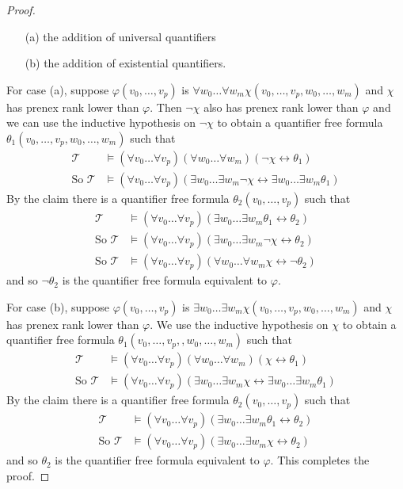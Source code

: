 \documentclass[titlepage, oneside]{amsbook}
\theoremstyle{plain}
\theoremstyle{definition}
\theoremstyle{remark}
\newcommand{\theory}{\ensuremath{\mathcal{T}}}
\newcommand{\frv}[2][0]{\ensuremath{\forall v_{#1} \dots  \forall   
v_{#2}}}
\newcommand{\frw}[2][0]{\ensuremath{\forall w_{#1}  \dots  \forall   
w_{#2}}}
\newcommand{\exw}[2][0]{\ensuremath{\exists w_{#1}  \dots  \exists
w_{#2}}}
\newcommand{\vnot}[2][0]{\ensuremath{ v_{#1} , \dots , v_{#2}}}
\newcommand{\wnot}[2][0]{\ensuremath{ w_{#1} , \dots , w_{#2}}}
\begin{document}
\begin{proof}
\begin{itemize}
\item[(a)] the addition of universal quantifiers
\item[(b)] the addition of existential quantifiers.
\end{itemize}

For case (a), suppose $\varphi ( \vnot p ) $ is $\frw m \chi ( \vnot p
, \wnot m )$ and $\chi$ has prenex rank lower than $\varphi$. Then
$\neg \chi$ also has prenex rank lower than $\varphi$ and we can use
the inductive hypothesis on $\neg \chi$ to obtain a quantifier free
formula $\theta_1 ( \vnot p , \wnot m )$ such that 
\[\begin{aligned} \theory &\models (\frv p ) (\frw m ) (\neg \chi
\leftrightarrow
\theta_1) \\
\mbox{So } \theory &\models (\frv p ) (\exw m \neg \chi
\leftrightarrow \exw m \theta_1) 
\end{aligned}
\]
By the claim there is a quantifier free formula $\theta_2 ( \vnot p)$
such that 
\[ \begin{aligned}
\theory &\models ( \frv p ) ( \exw m \theta_1 \leftrightarrow
\theta_2)\\
\mbox{So } \theory &\models ( \frv p ) ( \exw m \neg \chi
\leftrightarrow 
\theta_2)\\
\mbox{So } \theory &\models ( \frv p ) (\frw m  \chi
\leftrightarrow \neg \theta_2)
\end{aligned}
\]
and so $\neg \theta_2$ is the quantifier free formula equivalent to
$\varphi$.

For case (b), suppose $\varphi(v_0 , \dots , v_p )$ is $\exw m \chi (
\vnot p , \wnot m )$ and $\chi$ has prenex rank lower than $\varphi$.
We use the inductive hypothesis on $\chi$ to obtain a quantifier free
formula $\theta_1 ( \vnot p , , \wnot m )$ such that \[ \begin{aligned}
\theory &\models ( \frv p ) ( \frw m ) ( \chi \leftrightarrow \theta_1
) \\
\mbox{So } \theory &\models ( \frv p ) ( \exw m   \chi
\leftrightarrow \exw m \theta_1 )
\end{aligned} 
\]
By the claim there is a quantifier free formula $\theta_2 ( \vnot p )$
such that  \[\begin{aligned}  \theory &\models ( \frv p ) ( \exw m
\theta_1 \leftrightarrow
\theta_2 ) \\
\mbox{So }   \theory &\models ( \frv p ) ( \exw m \chi
\leftrightarrow \theta_2 ) 
\end{aligned}
\]
and so $\theta_2$ is the quantifier free formula equivalent to
$\varphi$.  This completes the proof.



\end{proof}
\end{document}
